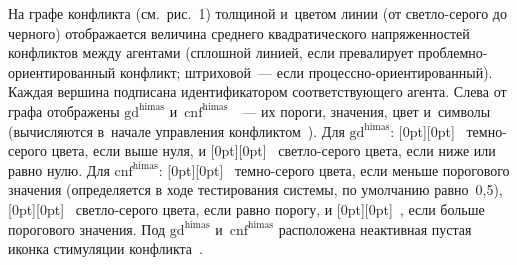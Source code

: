\begin{multicols}{2}
  На графе конфликта (см.\ рис.~1) толщиной и~цветом линии (от свет\-ло-се\-ро\-го 
до черного) отображается величина среднего квадратического напряженностей 
конфликтов между агентами (сплошной линией, если превалирует  
проб\-лем\-но-ори\-ен\-ти\-ро\-ван\-ный конфликт; штриховой~--- если  
про\-цес\-сно-ори\-ен\-ти\-ро\-ван\-ный). Каждая вершина подписана 
идентификатором соответствующего агента.
   Слева от графа отображены $\mathrm{gd}^{\mathrm{himas}}$ 
   и~$\mathrm{cnf}^{\mathrm{himas}}$~\cite{6-kir}~--- их пороги, значения, цвет 
   и~символы (вычисляются в~начале управ\-ле\-ния конфликтом~\cite{6-kir}). Для 
$\mathrm{gd}^{\mathrm{himas}}$: \raisebox{-1pt}[0pt][0pt]{\mbox{%
     \epsfxsize=3.8mm 
     }}  темно-серого цвета, если выше нуля, и \raisebox{-
1pt}[0pt][0pt]{\mbox{%
     \epsfxsize=3.8mm 
     }} свет\-ло-се\-ро\-го цвета, если ниже или равно нулю. Для 
$\mathrm{cnf}^{\mathrm{himas}}$: \raisebox{-1pt}[0pt][0pt]{\mbox{%
     \epsfxsize=3.8mm 
     }}  тем\-но-се\-ро\-го цвета, если меньше порогового значения 
(определяется в ходе тестирования системы, по умолчанию равно~0,5), 
\raisebox{-1pt}[0pt][0pt]{\mbox{%
     \epsfxsize=3.8mm 
     }}  свет\-ло-се\-ро\-го цвета, если равно порогу, и \raisebox{-
1pt}[0pt][0pt]{\mbox{%
     \epsfxsize=3.8mm 
     }}, если больше порогового значения. Под 
$\mathrm{gd}^{\mathrm{himas}}$ и~$\mathrm{cnf}^{\mathrm{himas}}$ 
расположена неактивная пустая иконка стимуляции  
конфликта~\cite{3-kir, 6-kir}.

\end{multicols}

\begin{figure*} %
\vspace*{1pt}
  \begin{center}  
    \mbox{%
\epsfxsize=133.521mm
}
\end{center}
\vspace*{-9pt}
\end{figure*} 

